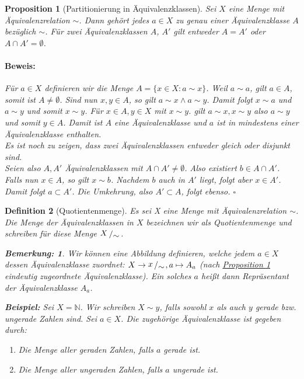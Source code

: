\documentclass{report}
\newcommand{\IN}[1]{\index{#1|BH}}
\newcommand{\N}{\mathbb{N}}
\theoremstyle{customrem}
\newtheorem*{bem}{Bemerkung\textnormal:}
\theoremstyle{customdef}
\newtheorem{definition}{Definition}[chapter]
\newtheorem{proposition}[definition]{Proposition}
\renewenvironment{proof}{\vspace{-.75cm}\paragraph{Beweis: }}{\vspace{-.5cm}\hfill$\square$}
\newcommand{\bigslant}[2]{{\raisebox{.1em}{$#1$}\left/\raisebox{-.2em}{$#2$}\right.}}
\begin{document}
	\begin{proposition}[Partitionierung in Äquivalenzklassen]
		\label{prop122}
		Sei $X$ eine Menge mit Äquivalenzrelation $\sim$. Dann gehört jedes $a \in X$ zu genau einer Äquivalenzklasse $A$ bezüglich $\sim$. Für zwei Äquivalenzklassen $A$, $A'$ gilt entweder $A = A'$ oder $A\cap A' = \emptyset$.\\
		\begin{proof}
			Für $a \in X$ definieren wir die Menge $A = \{x \in X : a \sim x\}$.
			Weil $a \sim a$, gilt $a \in A$, somit ist $A \neq \emptyset$. 
			Sind nun $x, y \in A$, so gilt $a \sim x \land a \sim y$. Damit folgt $x \sim a$ und $a \sim y$ und somit $x \sim y$.
			Für $x \in A, y \in X$ mit $x \sim y$. gilt $a \sim x, x \sim y$ also $a \sim y$ und somit $y \in A$.
			Damit ist $A$ eine Äquivalenzklasse und $a$ ist in \textit{mindestens} einer Äquivalenzklasse enthalten.\\[.125cm]
			Es ist noch zu zeigen, dass zwei Äquivalenzklassen entweder gleich oder disjunkt sind.\\
			Seien also $A, A'$ Äquivalenzklassen mit $A \cap A' \neq \emptyset$. Also existiert $b \in A\cap A'$. Falls nun $x \in A$, so gilt $x \sim b$. Nachdem $b$ auch in $A'$ liegt, folgt aber $x \in A'$. Damit folgt $a \subset A'$. Die Umkehrung, also $A' \subset A$, folgt ebenso.
		\end{proof}
	\end{proposition}
	
	\vspace{.25cm}
	
	\begin{definition}[Quotientenmenge]
		\IN{Menge!Quotienten-}
		Es sei X eine Menge mit Äquivalenzrelation $\sim$. Die Menge der Äquivalenzklassen in $X$ bezeichnen wir  als Quotientenmenge und schreiben für diese Menge $\bigslant{X}{\sim}$.\\
		\begin{bem}
			Wir können eine Abbildung definieren, welche jedem $a \in X$ dessen Äquivalenzklasse zuordnet:
			$X \to \bigslant{x}{\sim}, a \mapsto A_a$ (nach \hyperref[prop122]{Proposition \ref{prop122}} eindeutig zugeordnete Äquivalenzklasse).
			Ein solches $a$ heißt dann Repräsentant der Äquivalenzklasse $A_a$.\\
		\end{bem}
		\noindent\textbf{Beispiel: }
		Sei $X = \N$. Wir schreiben $X \sim y$, falls sowohl $x$ als auch $y$ gerade bzw. ungerade Zahlen sind.
		Sei $a \in X$. Die zugehörige Äquivalenzklasse ist gegeben durch:
		\begin{enumerate}[leftmargin=3cm]
			\itemsep0cm
			\item Die Menge aller geraden Zahlen, falls $a$ gerade ist.
			\item Die Menge aller ungeraden Zahlen, falls $a$ ungerade ist.
		\end{enumerate}
	\end{definition}
\end{document}
